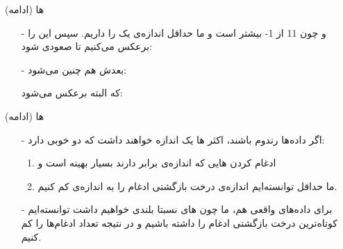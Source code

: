 \begin{frame}{ها (ادامه)}
\begin{itemize}\itemr
\item[-]
و چون 11 از 1- بیشتر است و ما حداقل اندازه‌ی یک  را داریم. سپس این  را برعکس می‌کنیم تا صعودی شود:
\begin{lfl}
\end{lfl}

\item[-]
بعدش هم چنین می‌شود:
\begin{lfl}
\end{lfl}

که البته برعکس می‌شود:
\begin{lfl}
\end{lfl}
\end{itemize}
\end{frame}
\begin{frame}{ها (ادامه)}
\begin{itemize}\itemr
\item[-]
اگر داده‌ها رندوم باشند، اکثر ها یک اندازه خواهند داشت که دو خوبی دارد:
\begin{enumerate}\itemr
\item 
ادغام کردن هایی که اندازه‌ی برابر دارند بسیار بهینه است و
\item 
ما حداقل توانسته‌ایم اندازه‌ی درخت بازگشتی ادغام را به اندازه‌ی 
کم کنیم.
\end{enumerate}

\item[-]
برای داده‌های واقعی هم، ما چون های نسبتا بلندی خواهیم داشت توانسته‌ایم کوتاه‌ترین درخت بازگشتی ادغام را داشته باشیم و در نتیجه تعداد ادغام‌ها را کم کنیم.
\end{itemize}
\end{frame}

